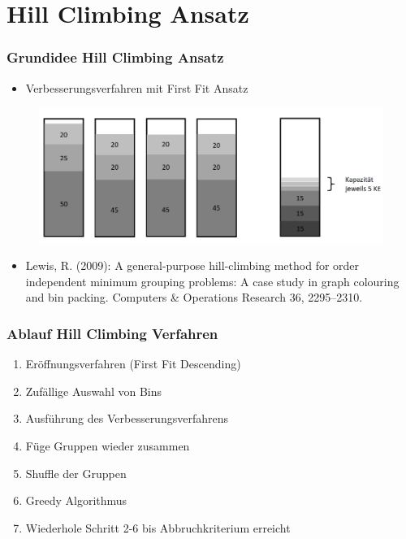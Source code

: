 \documentclass{beamer}
\begin{document}
\section{Hill Climbing Ansatz} 
\begin{frame}
\frametitle{Grundidee Hill Climbing Ansatz}
\begin{footnotesize}
\begin{itemize}
\item Verbesserungsverfahren mit First Fit Ansatz
\end{itemize}
\end{footnotesize}
\begin{figure}[!htbp]
\begin{center}
\includegraphics[scale=0.25]{img/HC_idee.png}
\end{center}
\end{figure}

\begin{scriptsize}
\begin{itemize}
\item Lewis, R. (2009): A general-purpose hill-climbing method for order independent minimum grouping problems: A case study in graph colouring and bin packing. Computers & Operations Research 36, 2295–2310.
\end{itemize}
\end{scriptsize}
\end{frame}
\begin{frame}
\frametitle{Ablauf Hill Climbing Verfahren}
\begin{footnotesize}
\begin{enumerate}
\item Eröffnungsverfahren (First Fit Descending)
\item Zufällige Auswahl von Bins 
\item Ausführung des Verbesserungsverfahrens
\item Füge Gruppen wieder zusammen
\item Shuffle der Gruppen
\item Greedy Algorithmus
\item Wiederhole Schritt 2-6 bis Abbruchkriterium erreicht
\end{enumerate}
\end{footnotesize}
\end{frame}
\end{document}
